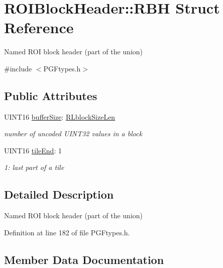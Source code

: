 \hypertarget{structROIBlockHeader_1_1RBH}{}\section{R\+O\+I\+Block\+Header\+::R\+BH Struct Reference}
\label{structROIBlockHeader_1_1RBH}


Named R\+OI block header (part of the union)  




{\ttfamily \#include $<$P\+G\+Ftypes.\+h$>$}

\subsection*{Public Attributes}
\begin{DoxyCompactItemize}
\item 
U\+I\+N\+T16 \mbox{\hyperlink{structROIBlockHeader_1_1RBH_af0c3de8c247b06116a9d84d2f9515762}{buffer\+Size}}\+: \mbox{\hyperlink{PGFtypes_8h_ac0d66809e03f0e5939ed8de744700079}{R\+Lblock\+Size\+Len}}
\begin{DoxyCompactList}\small\item\em number of uncoded U\+I\+N\+T32 values in a block \end{DoxyCompactList}\item 
U\+I\+N\+T16 \mbox{\hyperlink{structROIBlockHeader_1_1RBH_ac9ec75c32770d57468eaab631fd316c4}{tile\+End}}\+: 1
\begin{DoxyCompactList}\small\item\em 1\+: last part of a tile \end{DoxyCompactList}\end{DoxyCompactItemize}


\subsection{Detailed Description}
Named R\+OI block header (part of the union) 

Definition at line 182 of file P\+G\+Ftypes.\+h.



\subsection{Member Data Documentation}
\mbox{\label{structROIBlockHeader_1_1RBH_af0c3de8c247b06116a9d84d2f9515762}} 
